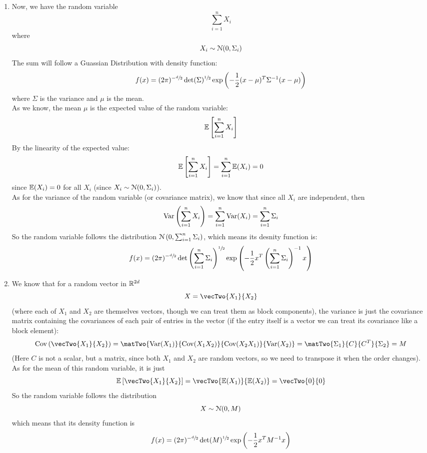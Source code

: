 \documentclass[12pt]{article}
\begin{document}
    \begin{enumerate}[label=\alph*)]
        \item 
        Now, we have the random variable
        \[ \sum_{i = 1}^{n} X_i \]
        where 
        \[ X_i \sim \mathcal{N}(0, \Sigma_i) \]
        The sum will follow a Guassian Distribution
        with density function:
        \[ f(x) = (2\pi)^{-\sfrac{d}{2}}
        \det(\Sigma)^{\sfrac{1}{2}}
        \exp\left( -\dfrac{1}{2}(x-\mu)^T
        \Sigma^{-1} (x - \mu) \right) \]
        where $\Sigma$ is the variance
        and $\mu$ is the mean. \\
        As we know, the mean $\mu$
        is the expected value of the
        random variable:
        \[ \mathbb{E}\left[ \sum_{i = 1}^{n} X_i \right] \]
        By the linearity of the expected value:
        \[ \mathbb{E}\left[ \sum_{i = 1}^{n} X_i \right] =
        \sum_{i = 1}^{n} \mathbb{E}(X_i) = 0 \]
        since $\mathbb{E}(X_i) = 0$ for all $X_i$
        (since $X_i \sim \mathcal{N}(0, \Sigma_i)$). \\
        As for the variance of the random
        variable (or covariance matrix),
        we know that since all $X_i$
        are independent,
        then 
        \[ \text{Var}\left( \sum_{i=1}^{n}X_i \right) = 
        \sum_{i=1}^{n} \text{Var}(X_i)
        = \sum_{i=1}^{n} \Sigma_i \]
        So the random variable follows
        the distribution 
        $\mathcal{N}\left( 0, \sum_{i=1}^{n} \Sigma_i \right)$,
        which means its desnity function is:
         \[ f(x) = (2\pi)^{-\sfrac{d}{2}}
        \det\left( \sum_{i=1}^{n} \Sigma_i \right)^{\sfrac{1}{2}}
        \exp\left( -\dfrac{1}{2}x^T
        \left( \sum_{i=1}^{n} \Sigma_i \right)^{-1} x \right) \]
        \item 
        We know that for a random vector
        in $\mathbb{R}^{2d}$
        \[ X = \vecTwo{X_1}{X_2} \]
        (where each of $X_1$ and $X_2$
        are themselves vectors, though we
        can treat them as block components),
        the variance is just
        the covariance matrix
        containing the covariances of each
        pair of entries in the vector
        (if the entry itself is a vector
        we can treat its covariance like 
        a block element):
        \[ \cov\para{\vecTwo{X_1}{X_2}}
        = \matTwo{\var(X_1)}{\cov(X_1X_2)}
        {\cov(X_2X_1)}{\var(X_2)} 
        = \matTwo{\Sigma_1}{C}
        {C^{T}}{\Sigma_2} = M \]
        (Here $C$ is not a scalar,
        but a matrix, since both $X_1$
        and $X_2$ are random vectors,
        so we need to transpose it when the order
        changes). \\
        As for the mean of this random variable,
        it is just 
        \[ \ebb\brac{ \vecTwo{X_1}{X_2}}
        = \vecTwo{\ebb(X_1)}{\ebb(X_2)}
        = \vecTwo{0}{0} \]
        So the random variable follows the
        distribution
        \[ X \sim \mathcal{N}(0, M) \]
        which means that its density function is
        \[ f(x) = (2\pi)^{-\sfrac{d}{2}}
        \det(M)^{\sfrac{1}{2}}
        \exp\left( -\dfrac{1}{2}x^T
        M^{-1} x \right) \]
    \end{enumerate}
\end{document}
